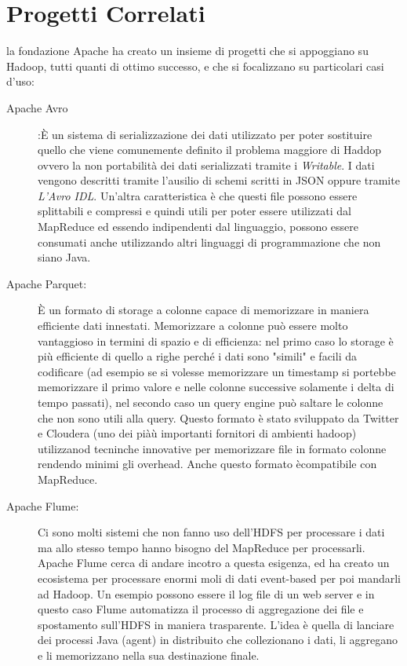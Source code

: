 \section{Progetti Correlati}
la fondazione Apache ha creato un insieme di progetti che si appoggiano su Hadoop, tutti quanti di ottimo successo, e che si focalizzano su particolari casi d'uso:
\begin{description}
  \item[Apache Avro]:È un sistema di serializzazione dei dati utilizzato per poter sostituire quello che viene comunemente definito il problema maggiore di Haddop ovvero la non portabilità dei dati serializzati tramite i \textit{Writable}. I dati vengono descritti tramite l'ausilio di schemi scritti in JSON oppure tramite \textit{L'Avro IDL}. Un'altra caratteristica è che questi file possono essere splittabili e compressi e quindi utili per poter essere utilizzati dal MapReduce ed essendo indipendenti dal linguaggio, possono essere consumati anche utilizzando altri linguaggi di programmazione che non siano Java.
  \item[Apache Parquet:] È un formato di storage a colonne capace di memorizzare in maniera efficiente dati innestati. Memorizzare a colonne può essere molto vantaggioso in termini di spazio e di efficienza: nel primo caso lo storage è più efficiente di quello a righe perché i dati sono "simili" e facili da codificare (ad esempio se si volesse memorizzare un timestamp si portebbe memorizzare il primo valore e nelle colonne successive solamente i delta di tempo passati), nel secondo caso un query engine può saltare le colonne che non sono utili alla query. Questo formato è stato sviluppato da Twitter e Cloudera (uno dei piàù importanti fornitori di ambienti hadoop) utilizzanod tecninche innovative per memorizzare file in formato colonne rendendo minimi gli overhead. Anche questo formato ècompatibile con MapReduce.
  \item[Apache Flume:] Ci sono molti sistemi che non fanno uso dell'HDFS per processare i dati ma allo stesso tempo hanno bisogno del MapReduce per processarli. Apache Flume cerca di andare incotro a questa esigenza, ed ha creato un ecosistema per processare enormi moli di dati event-based per poi mandarli ad Hadoop. Un esempio possono essere il log file di un web server e in questo caso Flume automatizza il processo di aggregazione dei file e spostamento sull'HDFS in maniera trasparente. L'idea è quella di lanciare dei processi Java (agent) in distribuito che collezionano i dati, li aggregano e li memorizzano nella sua destinazione finale.

\end{description}
